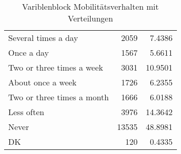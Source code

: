 \begin{table}[h]
\begin{tabularx}{\textwidth} { b{12cm} | r | r}
Several times a day          &   2059 &  7.4386 \\
Once a day                   &   1567 &  5.6611 \\
Two or three times a week    &   3031 & 10.9501 \\
About once a week            &   1726 &  6.2355 \\
Two or three times a month   &   1666 &  6.0188 \\
Less often                   &   3976 & 14.3642 \\
Never                        &  13535 & 48.8981 \\
DK                           &    120 &  0.4335 \\
	\end{tabularx}
	\caption{Variblenblock Mobilitätsverhalten mit Verteilungen}
\end{table}


